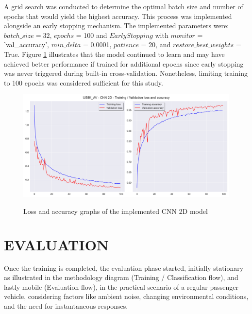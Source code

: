 A grid search was conducted to determine the optimal batch size and number of epochs that would yield the highest accuracy. This process was implemented alongside an early stopping mechanism. The implemented parameters were: $batch\_size = 32$, $epochs$ = 100 and $EarlyStopping$ with $monitor$ = 'val\_accuracy', $min\_delta$ = 0.0001, $patience$ = 20, and $restore\_best\_weights$ = True. Figure \ref{fig:methods_training_CNN_2D_loss_and_accuracy_graphs} illustrates that the model continued to learn and may have achieved better performance if trained for additional epochs since early stopping was never triggered during built-in cross-validation. Nonetheless, limiting training to 100 epochs was considered sufficient for this study.


\begin{figure}[htbp]
    \raggedright
        \caption{Loss and accuracy graphs of the implemented CNN 2D model}
        \includegraphics[width=1\textwidth]{resources/images/050-methods/Methods_training_CNN2D_loss_accuracy.png}
        \label{fig:methods_training_CNN_2D_loss_and_accuracy_graphs}
\end{figure} 


\section{EVALUATION}
\label{sec:methods_evaluation}

Once the training is completed, the evaluation phase started, initially stationary as illustrated in the methodology diagram (Training / Classification flow), and lastly mobile (Evaluation flow), in the practical scenario of a regular passenger vehicle, considering factors like ambient noise, changing environmental conditions, and the need for instantaneous responses.

